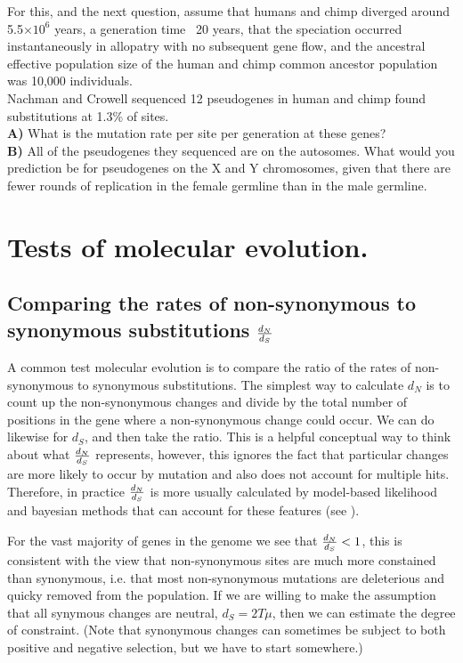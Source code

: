 \begin{question}
For this, and the next question, assume that humans and chimp diverged
around 5.5$\times 10^6$ years, a generation time ~20 years, that the speciation occurred instantaneously in allopatry with no subsequent gene flow, and the ancestral effective population size of the human and chimp common ancestor population was 10,000 individuals.\\
Nachman and Crowell sequenced 12 pseudogenes in human and chimp found substitutions at 1.3\% of sites. \\
{\bf A) } What is the mutation rate per site per generation at these genes?\\
{\bf B)} All of the pseudogenes they sequenced are on the autosomes. What
would you prediction be for pseudogenes on the X and Y chromosomes,
given that there are fewer rounds of replication in the female
germline than in the male germline.
\end{question}

\section{Tests of molecular evolution.}

\subsection{Comparing the rates of non-synonymous to synonymous
substitutions $\frac{d_N}{d_S}$}
A common test molecular evolution is to compare the ratio of the rates of non-synonymous to synonymous
substitutions. The simplest way to calculate $d_N$ is to 
count up the non-synonymous changes and divide by the total number of
positions in the gene where a non-synonymous change could occur. We
can do likewise for $d_S$, and then take the ratio. This is a helpful
conceptual way to think about what $\frac{d_N}{d_S}$ represents, however, this
ignores the fact that particular changes are more likely to occur by
mutation and also does not account for multiple hits. Therefore, in
practice $\frac{d_N}{d_S}$ is more usually calculated by model-based
likelihood and bayesian methods
that can account for these features (see ). 

For the vast majority of genes in the genome we see that $\frac{d_N}{d_S} < 1$, this is consistent with the view
that non-synonymous sites are much more constained than synonymous,
i.e. that most non-synonymous mutations are deleterious and quicky
removed from the population. If we are willing to make the assumption that all synymous changes are
neutral, $d_S=2T \mu$, then we can estimate the degree of constraint. (Note that synonymous changes can sometimes be subject to
both positive and negative selection, but we have to start somewhere.) 

